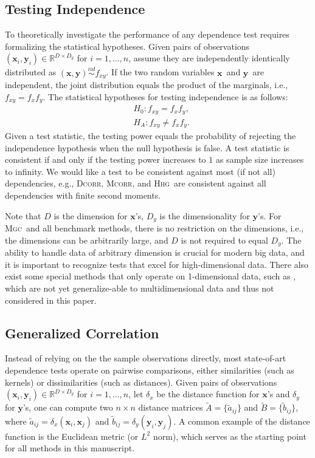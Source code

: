 \documentclass[11pt]{article}
\providecommand{\sct}[1]{{\normalfont\textsc{#1}}}
\providecommand{\mb}[1]{\boldsymbol{#1}}
\newcommand{\Real}{\mathbb{R}}
\newcommand{\Mgc}{\sct{Mgc}}
\newcommand{\Hhg}{\sct{Hhg}}
\newcommand{\Dcorr}{\sct{Dcorr}}
\newcommand{\Mcorr}{\sct{Mcorr}}
\newcommand{\mbx}{\ensuremath{\mb{x}}}
\newcommand{\mby}{\ensuremath{\mb{y}}}
\newcommand{\iid}{\overset{iid}{\sim}}
\begin{document}
\subsection{Testing Independence}

To theoretically investigate the performance of any dependence test requires formalizing the statistical hypotheses.
 Given pairs of observations $(\mb{x}_{i},\mb{y}_{i}) \in \Real^{D \times D_y}$ for $i=1,\ldots,n$, assume they are independently identically distributed as $(\mbx,\mby) \iid f_{xy}$. If the two random variables \mbx~and \mby~are independent, the joint distribution equals the product of the marginals, i.e., $f_{xy}=f_x f_y$.  The statistical hypotheses for testing independence is as follows:
\begin{align*}
& H_{0}: f_{xy}=f_{x}f_{y},\\
& H_{A}: f_{xy} \neq f_{x}f_{y}.
\end{align*}
Given a test statistic, the testing power equals the probability of rejecting the independence hypothesis when the null hypothesis is false. A test statistic is consistent if and only if the testing power increases to $1$ as sample size increases to infinity. We would like a test to be consistent against most (if not all) dependencies, e.g., \Dcorr, \Mcorr, and \Hhg~are consistent against all dependencies with finite second moments. %

Note that $D$ is the dimension for $\mb{x}$'s, $D_y$ is the dimensionality for $\mb{y}$'s. For \Mgc~and all benchmark methods, there is no restriction on the dimensions, i.e., the dimensions can be arbitrarily large, and $D$ is not required to equal $D_y$. The ability to handle data of arbitrary dimension is crucial for modern big data, and it is important to recognize tests that excel for high-dimensional data. There also exist some special methods that only operate on 1-dimensional data, such as \cite{Reshef2011,heller2016consistent,Huo2016}, which are not yet generalize-able to multidimensional data and thus not considered in this paper.

\subsection{Generalized Correlation}
Instead of relying on the the sample observations directly, most state-of-art dependence tests operate on pairwise comparisons, either similarities (such as kernels) or dissimilarities (such as distances). 
Given pairs of observations $(\mb{x}_{i},\mb{y}_{i}) \in \Real^{D \times D_y}$ for $i=1,\ldots,n$, let $\delta_x$ be the distance function for $\mb{x}$'s and $\delta_y$ for $\mb{y}$'s, one can compute two $n \times n$ distance matrices $\tilde{A}=\{\tilde{a}_{ij}\}$ and $\tilde{B}=\{\tilde{b}_{ij}\}$, where $\tilde{a}_{ij}=\delta_x(\mb{x}_i,\mb{x}_j)$ and $\tilde{b}_{ij}=\delta_y(\mb{y}_i,\mb{y}_j)$. A common example of the distance function is the Euclidean metric (or $L^{2}$ norm), which serves as the starting point for all methods in this manuscript.
\end{document}
